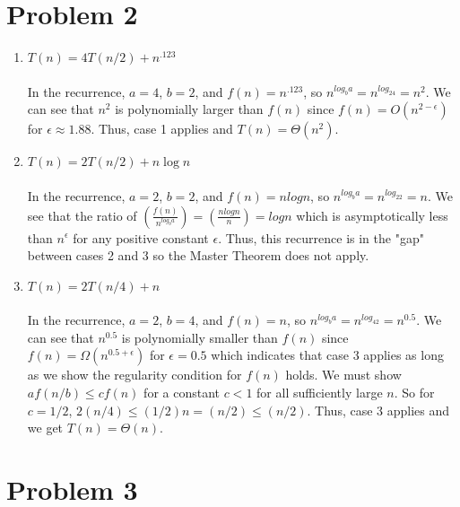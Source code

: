 \documentclass[11pt]{article}
\theoremstyle{nonumberplain}
\begin{document}
\section*{Problem 2}
\begin{enumerate}
\item $T(n) = 4 T(n / 2) + n^{.123}$ \\
\\
In the recurrence, $a=4$, $b=2$, and $f(n)=n^{.123}$, so $n^{log_ba}=n^{log_24}=n^2$. We can see that $n^2$ is polynomially larger than $f(n)$ since $f(n)=O(n^{2-\epsilon})$ for $\epsilon \approx 1.88$. Thus, case 1 applies and $T(n)=\Theta(n^2)$.
\item $T(n) = 2 T(n / 2) + n \log n$ \\
\\
In the recurrence, $a=2$, $b=2$, and $f(n)=nlogn$, so $n^{log_ba}=n^{log_22}=n$. We see that the ratio of $\left(\frac{f(n)}{n^{log_ba}}\right)=\left(\frac{nlogn}{n}\right)=logn$ which is asymptotically less than $n^\epsilon$ for any positive constant $\epsilon$. Thus, this recurrence is in the "gap" between cases 2 and 3 so the Master Theorem does not apply. 
\item $T(n) = 2 T(n / 4) + n$ \\
\\
In the recurrence, $a=2$, $b=4$, and $f(n)=n$, so $n^{log_ba}=n^{log_42}=n^{0.5}$. We can see that $n^0.5$ is polynomially smaller than $f(n)$ since $f(n)=\Omega(n^{0.5+\epsilon})$ for $\epsilon =0.5$ which indicates that case 3 applies as long as we show the regularity condition for $f(n)$ holds. We must show $af(n/b) \le cf(n)$ for a constant $c<1$ for all sufficiently large $n$. So for $c=1/2$, $2(n/4) \le (1/2)n=(n/2) \le (n/2)$. Thus, case 3 applies and we get $T(n)=\Theta(n)$.
\end{enumerate}

\section*{Problem 3}
\end{document}
